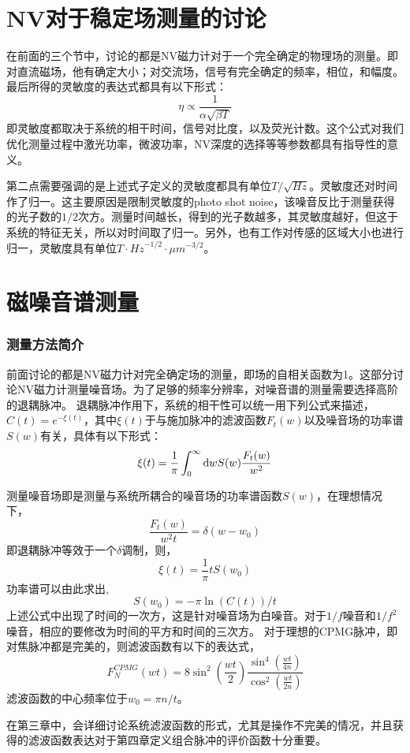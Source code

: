 \section{NV对于稳定场测量的讨论}
在前面的三个节中，讨论的都是NV磁力计对于一个完全确定的物理场的测量。即对直流磁场，他有确定大小；对交流场，信号有完全确定的频率，相位，和幅度。最后所得的灵敏度的表达式都具有以下形式：
\begin{equation}
    \eta \propto \frac{1}{\alpha \sqrt{\beta T}}    
\end{equation}
即灵敏度都取决于系统的相干时间，信号对比度，以及荧光计数。这个公式对我们优化测量过程中激光功率，微波功率，NV深度的选择等等参数都具有指导性的意义。

第二点需要强调的是上述式子定义的灵敏度都具有单位$\si{T}/\sqrt{\si{Hz}}$。灵敏度还对时间作了归一。这主要原因是限制灵敏度的photo shot noise，该噪音反比于测量获得的光子数的$1/2$次方。测量时间越长，得到的光子数越多，其灵敏度越好，但这于系统的特征无关，所以对时间取了归一。另外，也有工作对传感的区域大小也进行归一，灵敏度具有单位$T \cdot {\si{Hz}}^{-1/2} \cdot {\si{\mu m}}^{-3/2}$。

\section{磁噪音谱测量}
\subsubsection{测量方法简介}
前面讨论的都是NV磁力计对完全确定场的测量，即场的自相关函数为1。这部分讨论NV磁力计测量噪音场。为了足够的频率分辨率，对噪音谱的测量需要选择高阶的退耦脉冲。
退耦脉冲作用下，系统的相干性可以统一用下列公式来描述，$C(t)=e^{-\xi(t)}$，其中$\xi(t)$于与施加脉冲的滤波函数$F_t(w)$以及噪音场的功率谱$S(w)$有关，具体有以下形式：
\begin{equation}
    \xi (t)=\frac{1}{\pi}\int_{0}^{\infty}\mathop{}\!\mathrm{d} w S(w) \frac{F_t(w)}{w^2}
\end{equation}

测量噪音场即是测量与系统所耦合的噪音场的功率谱函数$S(w)$，在理想情况下，
\begin{equation}
    \frac{F_t(w)}{w^2 t}=\delta (w-w_0)
\end{equation}
即退耦脉冲等效于一个$\delta$调制，则，
\begin{equation}
    \xi (t)=\frac{1}{\pi} t S(w_0)
\end{equation}
功率谱可以由此求出,
\begin{equation}
    S(w_0)=-\pi \ln {(C(t))}/t
\end{equation}
上述公式中出现了时间的一次方，这是针对噪音场为白噪音。对于$1/f$噪音和$1/f^2$噪音，相应的要修改为时间的平方和时间的三次方。
对于理想的CPMG脉冲，即对焦脉冲都是完美的，则滤波函数有以下的表达式，
\begin{equation}
F_N^{CPMG}(wt)=8\sin^2(\frac{wt}{2})\frac{\sin^4(\frac{wt}{4n})}{\cos^2(\frac{wt}{2n})}    
\end{equation}
滤波函数的中心频率位于$w_0=\pi n/t$。

在第三章中，会详细讨论系统滤波函数的形式，尤其是操作不完美的情况，并且获得的滤波函数表达对于第四章定义组合脉冲的评价函数十分重要。
